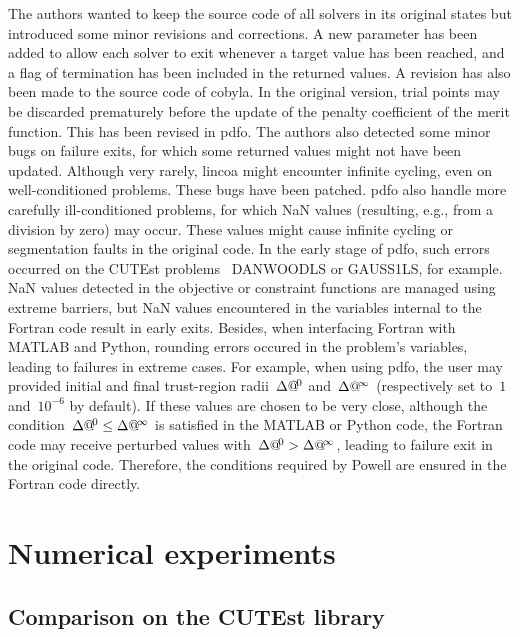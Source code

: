 The authors wanted to keep the source code of all solvers in its original states but introduced some minor revisions and corrections.
A new parameter has been added to allow each solver to exit whenever a target value has been reached, and a flag of termination has been included in the returned values.
A revision has also been made to the source code of \gls{cobyla}.
In the original version, trial points may be discarded prematurely before the update of the penalty coefficient of the merit function.
This has been revised in \gls{pdfo}.
The authors also detected some minor bugs on failure exits, for which some returned values might not have been updated.
Although very rarely, \gls{lincoa} might encounter infinite cycling, even on well-conditioned problems.
These bugs have been patched.
\Gls{pdfo} also handle more carefully ill-conditioned problems, for which NaN values (resulting, e.g., from a division by zero) may occur.
These values might cause infinite cycling or segmentation faults in the original code.
In the early stage of \gls{pdfo}, such errors occurred on the CUTEst problems~\cite{Gould_Orban_Toint_2015} DANWOODLS or GAUSS1LS, for example.
NaN values detected in the objective or constraint functions are managed using extreme barriers, but NaN values encountered in the variables internal to the Fortran code result in early exits.
Besides, when interfacing Fortran with MATLAB and Python, rounding errors occured in the problem's variables, leading to failures in extreme cases.
For example, when using \gls{pdfo}, the user may provided initial and final trust-region radii~$\rad[0]$ and~$\rad[\infty]$ (respectively set to~$1$ and~$10^{-6}$ by default).
If these values are chosen to be very close, although the condition~$\rad[0] \le \rad[\infty]$ is satisfied in the MATLAB or Python code, the Fortran code may receive perturbed values with~$\rad[0] > \rad[\infty]$, leading to failure exit in the original code.
Therefore, the conditions required by Powell are ensured in the Fortran code directly.

\section{Numerical experiments}
\label{sec:pdfo-experiments}

\subsection{Comparison on the CUTEst library}

